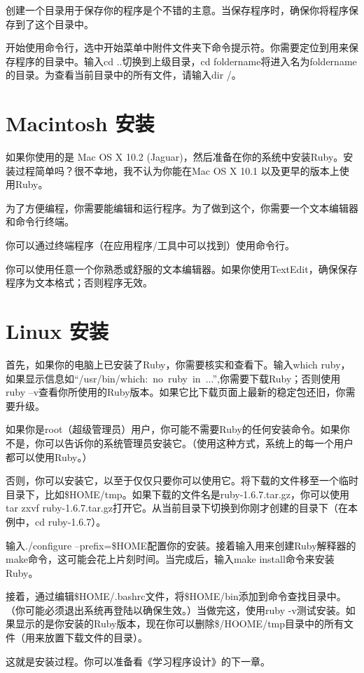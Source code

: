 创建一个目录用于保存你的程序是个不错的主意。当保存程序时，确保你将程序保存到了这个目录中。

开始使用命令行，选中开始菜单中附件文件夹下命令提示符。你需要定位到用来保存程序的目录中。输入cd ..切换到上级目录，cd foldername将进入名为foldername的目录。为查看当前目录中的所有文件，请输入dir /。

\section{Macintosh 安装}

如果你使用的是 Mac OS X 10.2 (Jaguar)，然后准备在你的系统中安装Ruby。安装过程简单吗？很不幸地，我不认为你能在Mac OS X 10.1 以及更早的版本上使用Ruby。

为了方便编程，你需要能编辑和运行程序。为了做到这个，你需要一个文本编辑器和命令行终端。

你可以通过终端程序（在应用程序/工具中可以找到）使用命令行。

你可以使用任意一个你熟悉或舒服的文本编辑器。如果你使用TextEdit，确保保存程序为文本格式；否则程序无效。

\section{Linux 安装}

首先，如果你的电脑上已安装了Ruby，你需要核实和查看下。输入which ruby，如果显示信息如“/usr/bin/which: no ruby in ...”,你需要下载Ruby；否则使用ruby –v查看你所使用的Ruby版本。如果它比下载页面上最新的稳定包还旧，你需要升级。

如果你是root（超级管理员）用户，你可能不需要Ruby的任何安装命令。如果你不是，你可以告诉你的系统管理员安装它。（使用这种方式，系统上的每一个用户都可以使用Ruby。）

否则，你可以安装它，以至于仅仅只要你可以使用它。将下载的文件移至一个临时目录下，比如\$HOME/tmp。如果下载的文件名是ruby-1.6.7.tar.gz，你可以使用tar zxvf ruby-1.6.7.tar.gz打开它。从当前目录下切换到你刚才创建的目录下（在本例中，cd ruby-1.6.7）。

输入./configure –prefix=\$HOME配置你的安装。接着输入用来创建Ruby解释器的make命令，这可能会花上片刻时间。当完成后，输入make install命令来安装Ruby。

接着，通过编辑\$HOME/.bashrc文件，将\$HOME/bin添加到命令查找目录中。（你可能必须退出系统再登陆以确保生效。）当做完这，使用ruby -v测试安装。如果显示的是你安装的Ruby版本，现在你可以删除\$/HOOME/tmp目录中的所有文件（用来放置下载文件的目录）。

这就是安装过程。你可以准备看《学习程序设计》的下一章。

